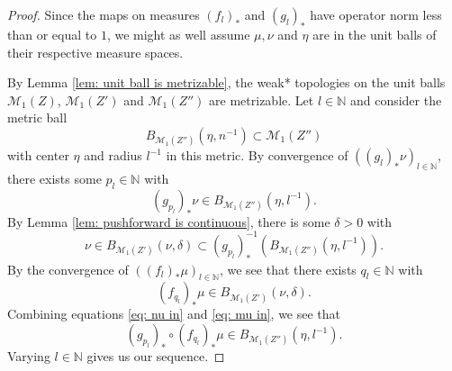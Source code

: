 \documentclass[reqno,11pt, twoside]{amsart}
\theoremstyle{plain}
\newtheorem{lem}[thm]{Lemma}
\theoremstyle{definition}
\theoremstyle{definition}
\theoremstyle{remark}
\numberwithin{equation}{section}
\newcommand\ca[1]{\mathcal{#1}}
\newcommand{\N}{{\mathbb{N}}}
\newcommand{\ignore}[1]{{}}
\begin{document}
\begin{proof}
    Since the maps on measures $(f_l)_*$ and $(g_l)_*$ have operator norm less than or equal to $1$, we might as well assume $\mu, \nu$ and $\eta$ are in the unit balls of their respective measure spaces.
    
    By Lemma \ref{lem: unit ball is metrizable}, the weak* topologies on the unit balls $\ca{M}_1(Z)$,  $\ca{M}_1(Z')$ and $\ca{M}_1(Z'')$ are metrizable. 
    Let $l\in \N$ and consider the metric ball
    \begin{equation*}
        B_{\ca{M}_1(Z'')}(\eta, n^{-1}) \subset \ca{M}_1(Z'')
    \end{equation*}
    with center $\eta$ and radius $l^{-1}$ in this metric.
By convergence of $((g_l)_* \nu)_{l \in \N}$, there exists some $p_l \in \N$ with
\begin{equation*}
    (g_{p_l})_* \nu \in B_{\ca{M}_1(Z'')}(\eta, l^{-1}).
\end{equation*}
By Lemma \ref{lem: pushforward is continuous}, there is some $\delta>0$ with
\begin{equation}\label{eq: nu in}
    \nu \in B_{\ca{M}_1(Z')}(\nu, \delta) \subset (g_{p_l})_*^{-1} \left( B_{\ca{M}_1(Z'')}(\eta, l^{-1}) \right).
\end{equation}
By the convergence of $((f_l)_* \mu)_{l \in \N}$, we see that there exists $ q_l \in \N$ with
\begin{equation}\label{eq: mu in}
    (f_{q_l})_* \mu \in B_{\ca{M}_1(Z')}(\nu, \delta).
\end{equation}
Combining equations \eqref{eq: nu in} and \eqref{eq: mu in}, we see that 
\begin{equation*}
    (g_{p_l})_* \circ (f_{q_l})_* \mu \in B_{\ca{M}_1(Z'')}(\eta, l^{-1}).
\end{equation*}
Varying $l \in \N$ gives us our sequence.
\end{proof}
\ignore{
\begin{lem}\label{lem: continuous maps are continuous}
    Let $Z, Z', Z''$ be locally compact second countable Hausdorff spaces. Let $(f_n)_{l \in \N}$ be a sequence of measurable maps maps from $Z \to Z'$, let $\mu \in \mathcal{M}(Z)$ and let $g : Z' \to Z''$ be a continuous proper map.
    If we have the weak* convergence
    \begin{equation*}
        \lim_{n \to \infty} (f_n)_* \mu = \nu \ \text{ in } \mathcal{M}(Z'),
    \end{equation*}
    then we also have the weak* convergence
    \begin{equation*}
        \lim_{n \to \infty} (g\circ f_n)_* \mu = g_* \nu \ \text{ in } \mathcal{M}(Z'').
    \end{equation*}
\end{lem}
\begin{proof}
This follows from Lemmas \ref{lem: functoriality of pushforwards}, \ref{lem: pushforward is continuous}.
\end{proof}
}
\end{document}
